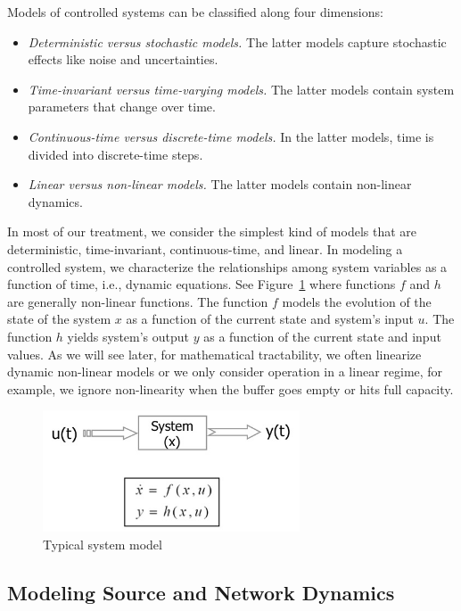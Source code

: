 \documentclass{article}
\begin{document}
Models of controlled systems can be classified along four dimensions:
\begin{itemize}
\item {\em Deterministic versus stochastic models.} The latter models capture stochastic effects like noise and uncertainties.

\item {\em Time-invariant versus time-varying models.} The latter models contain system parameters that change over time.

\item {\em Continuous-time versus discrete-time models.} In the latter models, time is divided into discrete-time steps.

\item {\em Linear versus non-linear models.} The latter models contain non-linear dynamics.
 
\end{itemize}
In most of our treatment, we consider the simplest kind of models that are deterministic, time-invariant, continuous-time, and linear. In modeling a controlled system, we characterize the relationships among system variables as a function of time, i.e., dynamic equations. See Figure~\ref{fig:system-model} where functions $f$ and $h$ are generally non-linear functions. 
The function $f$ models the evolution of the state of the system $x$ as 
a function of the current state and system's input $u$.
The function $h$ yields system's output $y$ as a function of the current state and input values.
As we will see later, for mathematical tractability, we often linearize dynamic non-linear models or 
we only consider operation in a linear regime, for example, we ignore non-linearity when 
the buffer goes empty or hits full capacity.
\begin{figure}[htbp]
   \centering
   \includegraphics[width=3in]{figures/system-model.jpg} %
   \caption{Typical system model}
   \label{fig:system-model}
\end{figure}

\subsection{Modeling Source and Network Dynamics}
\end{document}
